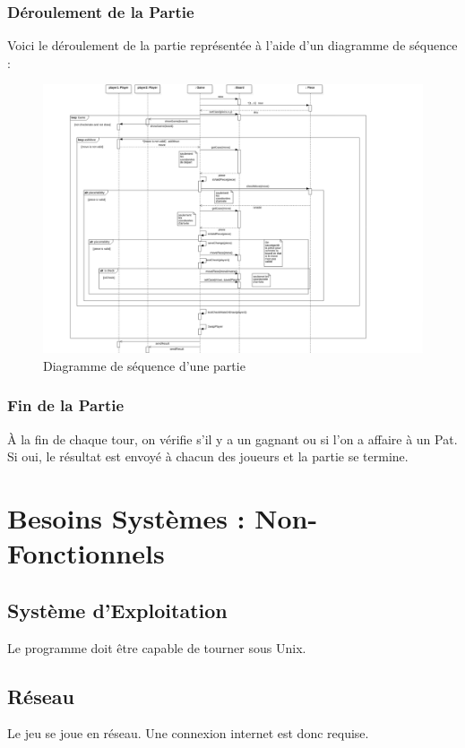 \documentclass[10pt, a4paper]{article}
\begin{document}
\subsubsection{Déroulement de la Partie}
Voici le déroulement de la partie représentée à l'aide d'un diagramme de séquence : \\

\begin{figure}[ht]
\centering
\includegraphics[scale=0.8]{SequenceDiagramClassicChessTurn.png}
\caption{Diagramme de séquence d'une partie}
\label{SD_classicgame}
\end{figure}
\clearpage



\subsubsection{Fin de la Partie}
À la fin de chaque tour, on vérifie s'il y a un gagnant ou si l'on a affaire à un Pat. Si oui, le résultat est envoyé à chacun des joueurs et la partie se termine.


\section{Besoins Systèmes : Non-Fonctionnels}


\subsection{Système d'Exploitation}
Le programme doit être capable de tourner sous Unix. \\

\subsection{Réseau}
Le jeu se joue en réseau. Une connexion internet est donc requise. \\
\end{document}
